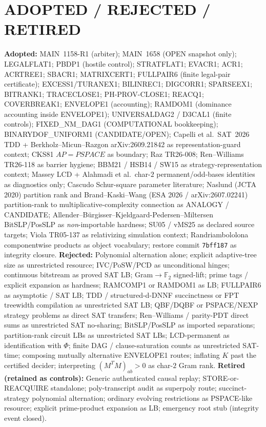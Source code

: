 \documentclass[11pt]{article}
\begin{document}
\section*{ADOPTED / REJECTED / RETIRED}
\textbf{Adopted:} MAIN~1158-R1 (arbiter); MAIN~1658 (OPEN snapshot only);
LEGALFLAT1; PBDP1 (hostile control); STRATFLAT1; EVACR1; ACR1; ACRTREE1; SBACR1;
MATRIXCERT1; FULLPAIR6 (finite legal-pair certificate); EXCESS1/TURANEX1;
BILINREC1; DIGCORR1; SPARSEEX1; BITRANK1; TRACECLOSE1; PH-PROV-CLOSE1; REACQ1;
COVERBREAK1; ENVELOPE1 (accounting); RAMDOM1 (dominance accounting inside
ENVELOPE1); UNIVERSALDAG2 / D3CAL1 (finite controls); FIXED\_NM\_DAG1
(COMPUTATIONAL bookkeeping); BINARYDOF\_UNIFORM1 (CANDIDATE/OPEN); Capelli et
al.\ SAT~2026 TDD + Berkholz--Micun--Razgon arXiv:2609.21842 as
representation-guard context; CKS81 $AP=PSPACE$ as boundary; Raz TR26-008;
Ren--Williams TR26-118 as barrier hygiene; BBM21 / HSB14 / SW15 as
strategy-representation context; Massey LCD + Alahmadi et al.\ char-$2$
permanent/odd-bases identities as diagnostics only; Cascudo Schur-square
parameter literature; Naslund (JCTA 2020) partition rank and Brand--Kaski--Wang
(ESA 2026 / arXiv:2607.02241) partition-rank to multiplicative-complexity
connection as ANALOGY / CANDIDATE; Allender--B\"urgisser--Kjeldgaard-Pedersen--Miltersen
BitSLP/PosSLP as \emph{non}-importable hardness; SU05 / vMS25 as declared source
targets; Viola TR05-137 as relativizing simulation context; Randriambololona
componentwise products as object vocabulary; restore commit \texttt{7bff187} as
integrity closure.
\textbf{Rejected:} Polynomial alternation alone; explicit adaptive-tree size as
unrestricted resource; IVC/PoSW/PCD as unconditional hinges; continuous bitstream
as proved SAT LB; Gram$\to\mathbb F_2$ signed-lift; prime tags / explicit expansion
as hardness; RAMCOMP1 or RAMDOM1 as LB; FULLPAIR6 as asymptotic / SAT LB;
TDD / structured-d-DNNF succinctness or FPT treewidth compilation as unrestricted
SAT LB; QBF/DQBF or PSPACE/NEXP strategy problems as direct SAT transfers;
Ren--Williams / parity-PDT direct sums as unrestricted SAT no-sharing;
BitSLP/PosSLP as imported separations; partition-rank circuit LBs as unrestricted
SAT LBs; LCD-permanent as identification with $\Phi$; finite DAG /
clause-saturation counts as unrestricted SAT-time; composing mutually alternative
ENVELOPE1 routes; inflating $K$ past the certified decider; interpreting
$(M^TM)_{ab}>0$ as char-$2$ Gram rank.
\textbf{Retired (retained as controls):} Generic authenticated causal replay;
STORE-or-REACQUIRE standalone; poly-transcript audit as superpoly route;
succinct-strategy polynomial alternation; ordinary evolving restrictions as
PSPACE-like resource; explicit prime-product expansion as LB; emergency root stub
(integrity event closed).
\end{document}
